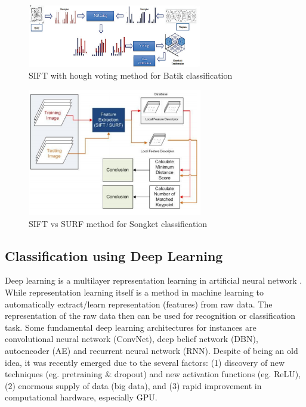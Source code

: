 \documentclass[conference]{IEEEtran}
\begin{document}
\begin{figure}[!b]
\centering
\includegraphics[width=3.0in]{sift-hough-voting-method}
\caption{SIFT with hough voting method for Batik classification}
\label{fig_sift_hough_voting_method}
\end{figure}

\begin{figure}[!b]
\centering
\includegraphics[width=3.0in]{songket-sift-vs-surf-methodology}
\caption{SIFT vs SURF method for Songket classification}
\label{fig_songket_sift_vs_surf_methodology}
\end{figure}

\subsection{Classification using Deep Learning}

Deep learning is a multilayer representation learning in artificial neural network \cite{lecun2015deep}. While representation learning itself is a method in machine learning to automatically extract/learn representation (features) from raw data. The representation of the raw data then can be used for recognition or classification task. Some fundamental deep learning architectures for instances are convolutional neural network (ConvNet), deep belief network (DBN), autoencoder (AE) and recurrent neural network (RNN). Despite of being an old idea, it was recently emerged due to the several factors: (1) discovery of new techniques (eg. pretraining \& dropout) and new activation functions (eg. ReLU), (2) enormous supply of data (big data), and (3) rapid improvement in computational hardware, especially GPU.
\end{document}
